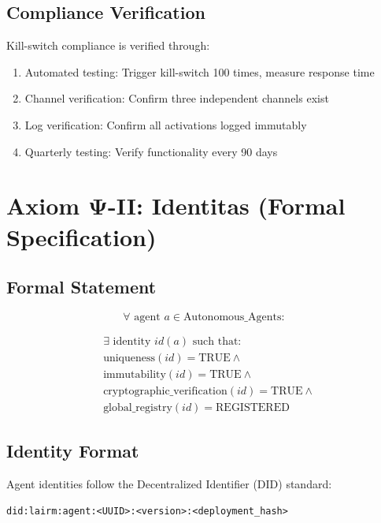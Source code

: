 \documentclass[12pt,a4paper,twoside,openright]{book}
\begin{document}
\subsection{Compliance Verification}

Kill-switch compliance is verified through:

\begin{enumerate}
    \item Automated testing: Trigger kill-switch 100 times, measure response time
    \item Channel verification: Confirm three independent channels exist
    \item Log verification: Confirm all activations logged immutably
    \item Quarterly testing: Verify functionality every 90 days
\end{enumerate}

\section{Axiom Ψ-II: Identitas (Formal Specification)}

\subsection{Formal Statement}

\begin{equation}
\forall \text{ agent } a \in \text{Autonomous\_Agents}:
\end{equation}

\begin{align}
&\exists \text{ identity } id(a) \text{ such that:} \\
&\text{uniqueness}(id) = \text{TRUE} \land \\
&\text{immutability}(id) = \text{TRUE} \land \\
&\text{cryptographic\_verification}(id) = \text{TRUE} \land \\
&\text{global\_registry}(id) = \text{REGISTERED}
\end{align}

\subsection{Identity Format}

Agent identities follow the Decentralized Identifier (DID) standard:

\begin{verbatim}
did:lairm:agent:<UUID>:<version>:<deployment_hash>
\end{verbatim}
\end{document}
